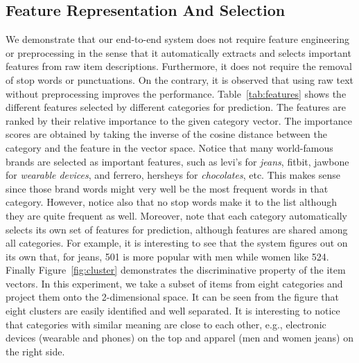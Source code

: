 \subsection{Feature Representation And Selection} %
\label{sub:catefeature_selection}
We demonstrate that our end-to-end system does not require feature engineering or preprocessing in the sense that it automatically extracts and selects important features from raw item descriptions. Furthermore, it does not require the removal of stop words or punctuations. On the contrary, it is observed that using raw text without preprocessing improves the performance. Table~\ref{tab:features} shows the different features selected by different categories for prediction. The features are ranked by their relative importance to the given category vector. The importance scores are obtained by taking the inverse of the cosine distance between the category and the feature in the vector space. Notice that many world-famous brands are selected as important features, such as levi's for \emph{jeans}, fitbit, jawbone for \emph{wearable devices}, and ferrero, hersheys for \emph{chocolates}, etc. This makes sense since those brand words might very well be the most frequent words in that category. However, notice also that no stop words make it to the list although they are quite frequent as well. Moreover, note that each category automatically selects its own set of features for prediction, although features are shared among all categories. For example, it is interesting to see that the system figures out on its own that, for jeans, 501 is more popular with men while women like 524. Finally Figure~\ref{fig:cluster} demonstrates the discriminative property of the item vectors. In this experiment, we take a subset of items from eight categories and project them onto the 2-dimensional space. It can be seen from the figure that eight clusters are easily identified and well separated. It is interesting to notice that categories with similar meaning are close to each other, e.g., electronic devices (wearable and phones) on the top and apparel (men and women jeans) on the right side.  




